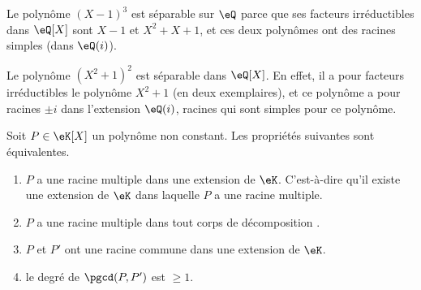\begin{example}
    Le polynôme \( (X-1)^3\) est séparable sur \( \eQ\) parce que ses facteurs irréductibles dans \( \eQ[X]\) sont \( X-1\) et \(X^2 + X + 1\), et ces deux polynômes ont des racines simples (dans \( \eQ(i)\)).
\end{example}

\begin{example}
    Le polynôme \( (X^2+1)^2\) est séparable dans \( \eQ[X]\). En effet, il a pour facteurs irréductibles le polynôme \( X^2+1\) (en deux exemplaires), et ce polynôme a pour racines \( \pm i\) dans l'extension \( \eQ(i)\), racines qui sont simples pour ce polynôme.
\end{example}

\begin{proposition}  \label{PropolyeZff}
    Soit \( P\in \eK[X]\) un polynôme non constant. Les propriétés suivantes sont équivalentes.
    \begin{enumerate}
        \item\label{ItemdqPFUi}
            \( P\) a une racine multiple dans une extension de \( \eK\). C'est-à-dire qu'il existe une extension de \( \eK\) dans laquelle \( P\) a une racine multiple.
        \item\label{ItemdqPFUib}
            \( P\) a une racine multiple dans tout corps de décomposition .
        \item\label{ItemdqPFUii}
            \( P\) et \( P'\) ont une racine commune dans une extension de \( \eK\).
        \item\label{ItemdqPFUiii}
            le degré de \( \pgcd(P,P')\) est \( \geq 1\).
    \end{enumerate}
\end{proposition}

